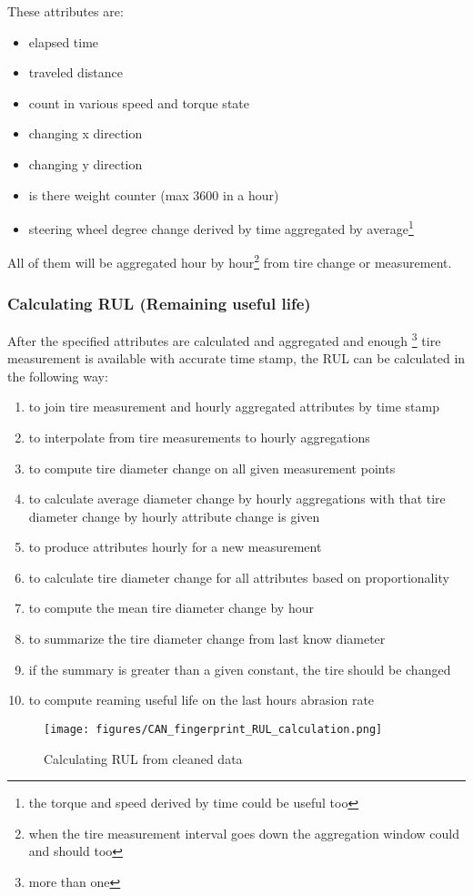 	These attributes are:
	\begin{itemize}
		\item{elapsed time} 
		\item{traveled distance} 
		\item{count in various speed and torque state}
		\item{changing x direction}
		\item{changing y direction}
		\item{is there weight counter (max 3600 in a hour)}
		\item{steering wheel degree change derived by time aggregated by average}\footnote{the torque and speed derived by time could be useful too}
	\end{itemize}
	All of them will be aggregated hour by hour\footnote{when the tire measurement interval goes down the aggregation window could and should too} from tire change or measurement.
	\subsubsection{Calculating RUL (Remaining useful life)}
	After the specified attributes are calculated and aggregated and enough \footnote{more than one} tire measurement is available with accurate time stamp, the RUL can be calculated in the following way:

	\begin{enumerate}
		\item{to join tire measurement and hourly aggregated attributes by time stamp}
		\item{to interpolate from tire measurements to hourly aggregations}
		\item{to compute tire diameter change on all given measurement points}
		\item{to calculate average diameter change by hourly aggregations} with that tire diameter change by hourly attribute change is given
		\item{to produce attributes hourly for a new measurement}
		\item{to calculate tire diameter change for all attributes based on proportionality}
		\item{to compute the mean tire diameter change by hour}
		\item{to summarize the tire diameter change from last know diameter}
		\item{if the summary is greater than a given constant, the tire should be changed}
		\item{to compute reaming useful life on the last hours abrasion rate}
	\end{enumerate}
	\begin{figure}[!ht]
		\centering
		\texttt{[image: figures/CAN\_fingerprint\_RUL\_calculation.png]}
		\caption{Calculating RUL from cleaned data} 
	\end{figure}
